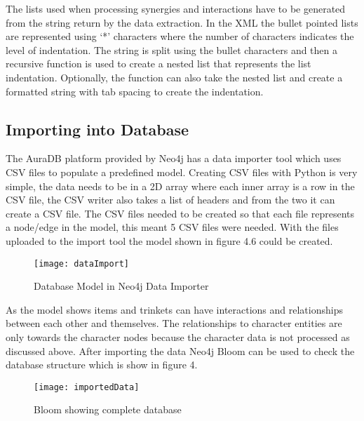 The lists used when processing synergies and interactions have to be generated from the string return by the data extraction.
In the XML the bullet pointed lists are represented using `*' characters where the number of characters indicates the level of indentation.
The string is split using the bullet characters and then a recursive function is used to create a nested list that represents the list indentation.
Optionally, the function can also take the nested list and create a formatted string with tab spacing to create the indentation.
\subsection{Importing into Database}
The AuraDB platform provided by Neo4j has a data importer tool which uses CSV files to populate a predefined model. 
Creating CSV files with Python is very simple, the data needs to be in a 2D array where each inner array is a row in the CSV file,
the CSV writer also takes a list of headers and from the two it can create a CSV file. The CSV files needed to be created so that each file represents 
a node/edge in the model, this meant 5 CSV files were needed. With the files uploaded to the import tool the model shown in figure 4.6 could be created.
\begin{figure}[!htbp]
    \centering
    \texttt{[image: dataImport]}
    \caption{Database Model in Neo4j Data Importer}
\end{figure}
As the model shows items and trinkets can have interactions and relationships between each other and themselves. The relationships to character 
entities are only towards the character nodes because the character data is not processed as discussed above.
After importing the data Neo4j Bloom can be used to check the database structure which is show in figure 4.
\begin{figure}[!htbp]
    \centering
    \texttt{[image: importedData]}
    \caption{Bloom showing complete database}
\end{figure}
